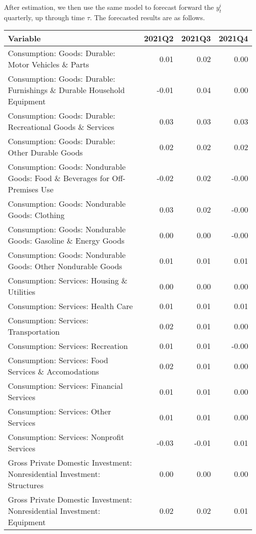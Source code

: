 \documentclass[11pt, letterpaper]{article}\usepackage[]{graphicx}\usepackage[]{color}
\begin{document}
After estimation, we then use the same model to forecast forward the $y^i_t$ quarterly, up through time $\tau$. 
The forecasted results are as follows.
\begin{table}[H]
\centering
\begingroup\scriptsize
\begin{tabular}{lrrr}
  \hline
Variable & 2021Q2 & 2021Q3 & 2021Q4 \\ 
  \hline
Consumption: Goods: Durable: Motor Vehicles \& Parts & 0.01 & 0.02 & 0.00 \\ 
  Consumption: Goods: Durable: Furnishings \& Durable Household Equipment & -0.01 & 0.04 & 0.00 \\ 
  Consumption: Goods: Durable: Recreational Goods \& Services & 0.03 & 0.03 & 0.03 \\ 
  Consumption: Goods: Durable: Other Durable Goods & 0.02 & 0.02 & 0.02 \\ 
  Consumption: Goods: Nondurable Goods: Food \& Beverages for Off-Premises Use & -0.02 & 0.02 & -0.00 \\ 
  Consumption: Goods: Nondurable Goods: Clothing & 0.03 & 0.02 & -0.00 \\ 
  Consumption: Goods: Nondurable Goods: Gasoline \& Energy Goods & 0.00 & 0.00 & -0.00 \\ 
  Consumption: Goods: Nondurable Goods: Other Nondurable Goods & 0.01 & 0.01 & 0.01 \\ 
  Consumption: Services: Housing \& Utilities & 0.00 & 0.00 & 0.00 \\ 
  Consumption: Services: Health Care & 0.01 & 0.01 & 0.01 \\ 
  Consumption: Services: Transportation & 0.02 & 0.01 & 0.00 \\ 
  Consumption: Services: Recreation & 0.01 & 0.01 & -0.00 \\ 
  Consumption: Services: Food Services \& Accomodations & 0.02 & 0.01 & 0.00 \\ 
  Consumption: Services: Financial Services & 0.01 & 0.01 & 0.00 \\ 
  Consumption: Services: Other Services & 0.01 & 0.01 & 0.00 \\ 
  Consumption: Services: Nonprofit Services & -0.03 & -0.01 & 0.01 \\ 
  Gross Private Domestic Investment: Nonresidential Investment: Structures & 0.00 & 0.00 & 0.00 \\ 
  Gross Private Domestic Investment: Nonresidential Investment: Equipment & 0.02 & 0.02 & 0.01 \\ 

\end{tabular}
\end{table}
\end{document}
